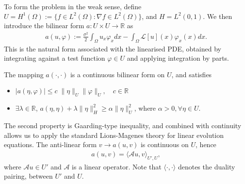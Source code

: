 \documentclass[10pt]{article}
\begin{document}
To form the problem in the weak sense, define $U=H^1(\Omega):= \{f \in L^2(\Omega) : \nabla f \in L^2(\Omega)\}$, and $H = L^2(0,1)$. We then introduce the bilinear form $a: U \times U \rightarrow \mathbb{R}$ as
\begin{align}\label{eqn: a(u,psi)}
    a(u,\varphi) := \frac{\sigma^2}{2}\int_\Omega u_x \varphi_x dx - \int_\Omega \mathcal{L}[u](x) \varphi_x(x) dx.
\end{align}
This is the natural form associated with the linearised PDE, obtained by integrating against a test function $\varphi \in U$ and applying integration by parts.
\begin{proposition}\label{prop: linear stability, a is bilinear}
    The mapping $a(\cdot,\cdot)$ is a continuous bilinear form on $U$, and satisfies
    \begin{itemize}
        \item $|a(\eta, \varphi)| \leq c\;\|\eta\|_U\|\varphi\|_U,\quad c \in \mathbb{R}$ 
        \item $\exists \lambda \in \mathbb{R}$, $a(\eta,\eta) + \lambda \|\eta\|_{H}^2 \geq \alpha \|\eta\|_U^2$, where $\alpha >0, \forall \eta \in U$.
    \end{itemize}
\end{proposition}
The second property is Gaarding-type inequality, and combined with continuity allows us to apply the standard Lions-Magenes \cite{LionsMagenes1972} theory for linear evolution equations. The anti-linear form $v\rightarrow a(u,v)$ is continuous on $U$, hence 
\begin{align*}
    a(u,v) = \langle \mathcal{A}u,v\rangle_{U',U},
\end{align*}
where $\mathcal{A}u \in U'$ and $\mathcal{A}$ is a linear operator. Note that $\langle \cdot, \cdot \rangle$ denotes the duality pairing, between $U'$ and $U$.
\end{document}
